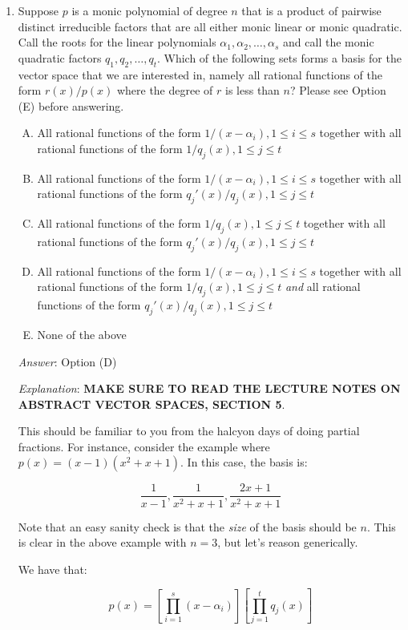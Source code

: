 \documentclass[10pt]{amsart}
\begin{document}
\begin{enumerate}
\item Suppose $p$ is a monic polynomial of degree $n$ that is a
  product of pairwise distinct irreducible factors that are all either
  monic linear or monic quadratic. Call the roots for the linear
  polynomials $\alpha_1, \alpha_2,\dots,\alpha_s$ and call the monic
  quadratic factors $q_1,q_2,\dots,q_t$. Which of the following sets
  forms a basis for the vector space that we are interested in, namely
  all rational functions of the form $r(x)/p(x)$ where the degree of
  $r$ is less than $n$? Please see Option (E) before answering.

  \begin{enumerate}[(A)]
  \item All rational functions of the form $1/(x - \alpha_i), 1 \le i
    \le s$ together with all rational functions of the form $1/q_j(x),
    1 \le j \le t$
  \item All rational functions of the form $1/(x - \alpha_i), 1 \le i
    \le s$ together with all rational functions of the form $q_j'(x)/q_j(x),
    1 \le j \le t$
  \item All rational functions of the form $1/q_j(x), 1 \le j \le t$
    together with all rational functions of the form $q_j'(x)/q_j(x),
    1 \le j \le t$
  \item All rational functions of the form $1/(x - \alpha_i), 1 \le i
    \le s$ together with all rational functions of the form $1/q_j(x),
    1 \le j \le t$ {\em and} all rational functions of the form
    $q_j'(x)/q_j(x), 1 \le j \le t$
  \item None of the above
  \end{enumerate}

  {\em Answer}: Option (D)

  {\em Explanation}: {\bf MAKE SURE TO READ THE LECTURE NOTES ON
    ABSTRACT VECTOR SPACES, SECTION 5}.

  This should be familiar to you from the halcyon days of doing
  partial fractions. For instance, consider the example where $p(x) =
  (x - 1)(x^2 + x + 1)$. In this case, the basis is:

  $$\frac{1}{x - 1}, \frac{1}{x^2 + x + 1}, \frac{2x + 1}{x^2 + x + 1}$$

  Note that an easy sanity check is that the {\em size} of the basis
  should be $n$. This is clear in the above example with $n = 3$, but
  let's reason generically.

  We have that:

  $$p(x) = \left[\prod_{i=1}^s (x - \alpha_i)\right]\left[\prod_{j=1}^t q_j(x)\right]$$


\end{enumerate}
\end{document}
